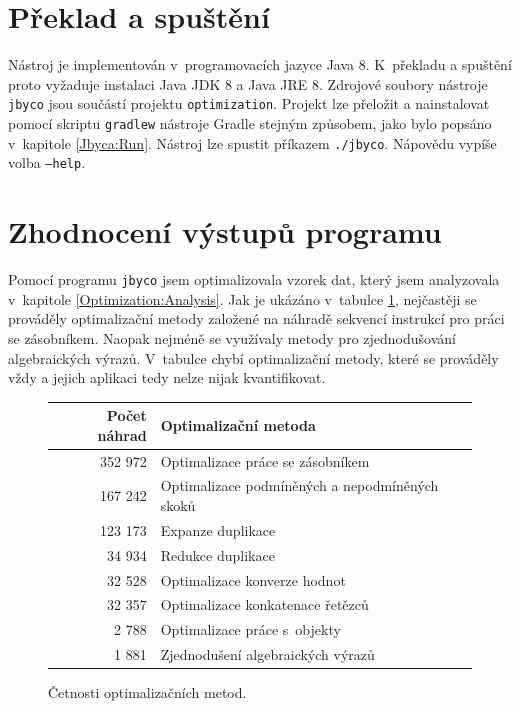 \section{Překlad a spuštění}

Nástroj je implementován v~programovacích jazyce Java 8. K~překladu a spuštění proto vyžaduje instalaci Java JDK 8 a Java JRE 8. Zdrojové soubory nástroje \texttt{jbyco} jsou součástí projektu \texttt{optimization}. Projekt lze přeložit a nainstalovat pomocí skriptu \texttt{gradlew} nástroje Gradle stejným způsobem, jako bylo popsáno v~kapitole \ref{Jbyca:Run}. Nástroj lze spustit příkazem \texttt{./jbyco}. Nápovědu vypíše volba \texttt{---help}.

\section{Zhodnocení výstupů programu}\label{Jbyco:Results}

Pomocí programu \texttt{jbyco} jsem optimalizovala vzorek dat, který jsem analyzovala v~kapitole \ref{Optimization:Analysis}. Jak je ukázáno v~tabulce \ref{tab:methods}, nejčastěji se prováděly optimalizační metody založené na náhradě sekvencí instrukcí pro práci se zásobníkem. Naopak nejméně se využívaly metody pro zjednodušování algebraických výrazů. V~tabulce chybí optimalizační metody, které se prováděly vždy a jejich aplikaci tedy nelze nijak kvantifikovat.

\begin{figure}
\begin{center}
  \begin{tabular}{r l} \hline
  \textbf{Počet náhrad} & \textbf{Optimalizační metoda} \\\hline

352 972	&	Optimalizace práce se zásobníkem	\\
167 242	&	Optimalizace podmíněných a nepodmíněných skoků	\\
123 173	&	Expanze duplikace	\\
34 934	&	Redukce duplikace	\\
32 528	&	Optimalizace konverze hodnot	\\
32 357	&	Optimalizace konkatenace řetězců	\\
2 788	&	Optimalizace práce s~objekty	\\
1 881	&	Zjednodušení algebraických výrazů	\\\hline

  \end{tabular}
\end{center}
\caption{Četnosti optimalizačních metod.}
\label{tab:methods}
\end{figure}

